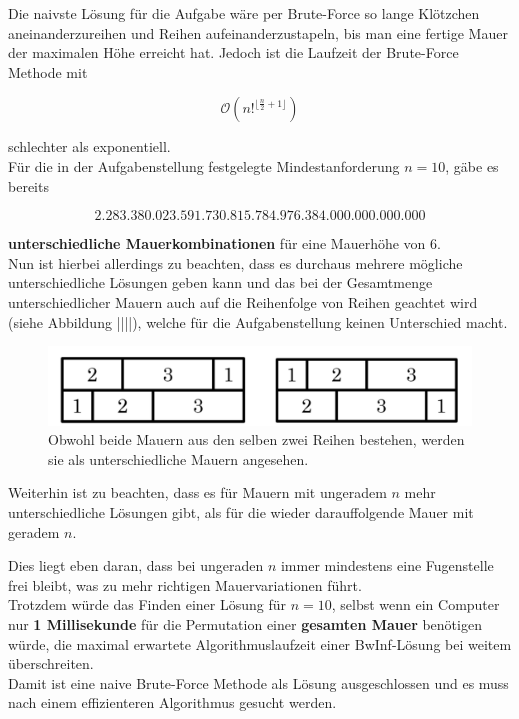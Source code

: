 \documentclass[a4paper,12pt]{article}
\begin{document}
Die naivste Lösung für die Aufgabe wäre per Brute-Force so lange Klötzchen aneinanderzureihen und Reihen aufeinanderzustapeln, bis man eine fertige Mauer der maximalen Höhe erreicht hat. Jedoch ist die Laufzeit der Brute-Force Methode mit
\begin{center}
\begin{Large}
\[\mathcal{O}(n!^{\lfloor\frac{n}{2}+1\rfloor})\]
\end{Large}
\end{center}
schlechter als exponentiell.
\\[0.4cm]
Für die in der Aufgabenstellung festgelegte Mindestanforderung $n = 10$, gäbe es bereits
\begin{center}
\begin{Large}
\[2.283.380.023.591.730.815.784.976.384.000.000.000.000\]
\end{Large}
\end{center}
\textbf{unterschiedliche Mauerkombinationen} für eine Mauerhöhe von 6.
\\[0.4cm]
Nun ist hierbei allerdings zu beachten, dass es durchaus mehrere mögliche unterschiedliche Lösungen geben kann und das bei der Gesamtmenge unterschiedlicher Mauern auch auf die Reihenfolge von Reihen geachtet wird (siehe Abbildung ||||), welche für die Aufgabenstellung keinen Unterschied macht.
\begin{figure}[H]
    \centering
    \includegraphics[width=0.9\linewidth]{Bilder/Aufgabe1/Mauervarianten_N3.png}
    \caption{Obwohl beide Mauern aus den selben zwei Reihen bestehen, werden sie als unterschiedliche Mauern angesehen.}
\end{figure}
Weiterhin ist zu beachten, dass es für Mauern mit ungeradem $n$ mehr unterschiedliche Lösungen gibt, als für die wieder darauffolgende Mauer mit geradem $n$.

Dies liegt eben daran, dass bei ungeraden $n$ immer mindestens eine Fugenstelle frei bleibt, was zu mehr richtigen Mauervariationen führt.
\\[0.4cm]
Trotzdem würde das Finden einer Lösung für $n = 10$, selbst wenn ein Computer nur \textbf{1 Millisekunde} für die Permutation einer \textbf{gesamten Mauer} benötigen würde, die maximal erwartete Algorithmuslaufzeit einer BwInf-Lösung bei weitem überschreiten.
\\[0.4cm]
Damit ist eine naive Brute-Force Methode als Lösung ausgeschlossen und es muss nach einem effizienteren Algorithmus gesucht werden.
\end{document}
